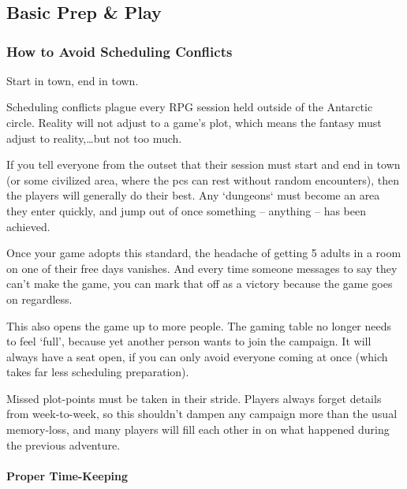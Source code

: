 \chapter{}

\section{Basic Prep \& Play}

\begin{multicols}{2}

\subsection{How to Avoid Scheduling Conflicts}

Start in town, end in town.

Scheduling conflicts plague every RPG session held outside of the Antarctic circle.
Reality will not adjust to a game's plot, which means the fantasy must adjust to reality,\ldots but not too much.

If you tell everyone from the outset that their session must start and end in town (or some civilized area, where the \glspl{pc} can rest without random encounters), then the players will generally do their best.
Any `dungeons` must become an area they enter quickly, and jump out of once something -- anything -- has been achieved.

Once your game adopts this standard, the headache of getting 5 adults in a room on one of their free days vanishes.
And every time someone messages to say they can't make the game, you can mark that off as a victory because the game goes on regardless.

This also opens the game up to more people.
The gaming table no longer needs to feel `full', because yet another person wants to join the campaign.
It will always have a seat open, if you can only avoid everyone coming at once (which takes far less scheduling preparation).

Missed plot-points must be taken in their stride.
Players always forget details from week-to-week, so this shouldn't dampen any campaign more than the usual memory-loss, and many players will fill each other in on what happened during the previous \gls{adventure}.

\subsubsection{Proper Time-Keeping}


\end{multicols}
